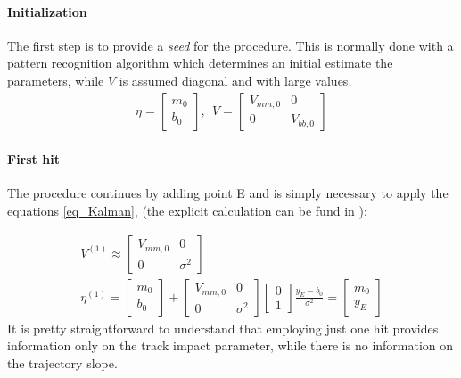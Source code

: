 \documentclass[12pt,a4paper,openright, oneside, titlepage]{book} %
\begin{document}
\paragraph{Initialization} 
The first step is to provide a \textit{seed} for the procedure. 
This is normally done with a pattern recognition algorithm 
which determines an initial estimate the parameters, 
while $V$ is assumed diagonal and with large values.
\begin{align*}
\eta = \begin{bmatrix} m_0 \\  b_0 \end{bmatrix},\ \ V=\begin{bmatrix} V_{mm,0}& 0 \\ 0& V_{bb,0} \end{bmatrix}
\end{align*}

\paragraph{First hit} 
The procedure continues by adding point E
and is simply necessary to apply the equations \ref{eq_Kalman}, 
(the explicit calculation can be fund in \cite{Kutschke}):

\begin{gather*}
V^{(1)}\approx \begin{bmatrix}
V_{mm,0} & 0 \\ 0 & \sigma^2
\end{bmatrix}\\
\eta^{(1)} = 
\begin{bmatrix} m_0 \\  b_0 \end{bmatrix} +
\begin{bmatrix} V_{mm,0} & 0 \\ 0 & \sigma^2 \end{bmatrix}
\begin{bmatrix} 0 \\ 1 \end{bmatrix}
\frac{y_E-b_0}{\sigma^2}
= \begin{bmatrix}
m_0 \\ y_E
\end{bmatrix}
\end{gather*}
It is pretty straightforward to understand that employing just one hit provides information 
only on the track impact parameter, while there is no information on the trajectory slope.
\end{document}
